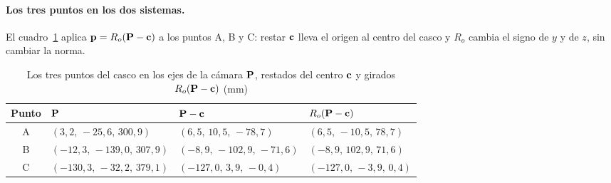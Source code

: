 \paragraph{Los tres puntos en los dos sistemas.} El cuadro~\ref{tab:objeto-vec} aplica $\mathbf{p}=R_o(\mathbf{P}-\mathbf{c})$ a los puntos A, B y C: restar $\mathbf{c}$ lleva el origen al centro del casco y $R_o$ cambia el signo de $y$ y de $z$, sin cambiar la norma.

\begin{table}[htbp]
\caption{Los tres puntos del casco en los ejes de la cámara $\mathbf{P}$, restados del centro $\mathbf{c}$ y girados $R_o(\mathbf{P}-\mathbf{c})$ (mm)}
\label{tab:objeto-vec}
\centering\footnotesize
\begin{tabular}{@{}cp{3.7cm}p{3.7cm}p{3.7cm}@{}}
\toprule
Punto & $\mathbf{P}$ & $\mathbf{P}-\mathbf{c}$ & $R_o(\mathbf{P}-\mathbf{c})$ \\
\midrule
A & $(3{,}2,\,-25{,}6,\,300{,}9)$ & $(6{,}5,\,10{,}5,\,-78{,}7)$ & $(6{,}5,\,-10{,}5,\,78{,}7)$ \\
B & $(-12{,}3,\,-139{,}0,\,307{,}9)$ & $(-8{,}9,\,-102{,}9,\,-71{,}6)$ & $(-8{,}9,\,102{,}9,\,71{,}6)$ \\
C & $(-130{,}3,\,-32{,}2,\,379{,}1)$ & $(-127{,}0,\,3{,}9,\,-0{,}4)$ & $(-127{,}0,\,-3{,}9,\,0{,}4)$ \\
\bottomrule
\end{tabular}
\end{table}
